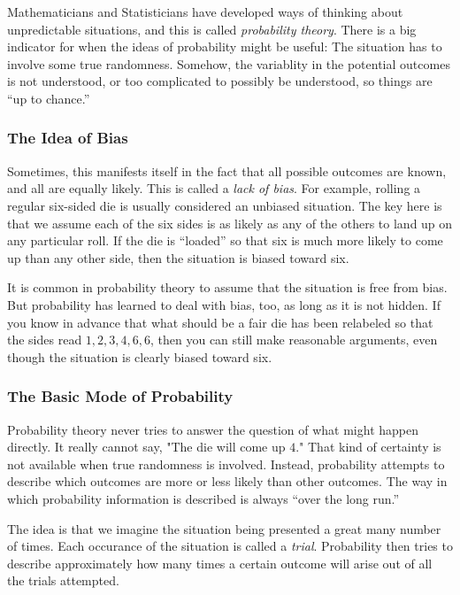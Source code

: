 \documentclass[12pt,letterpaper]{article}
\theoremstyle{definition}
\begin{document}
Mathematicians and Statisticians have developed ways of thinking about unpredictable situations, and this is called \emph{probability theory}.
There is a big indicator for when the ideas of probability might be useful:
The situation has to involve some true randomness.
Somehow, the variablity in the potential outcomes is not understood, or too complicated to possibly be understood, so things are ``up to chance.''

\subsubsection*{The Idea of Bias}

Sometimes, this manifests itself in the fact that all possible outcomes are known, and all are equally likely.
This is called a \emph{lack of bias}. 
For example, rolling a regular six-sided die is usually considered an unbiased situation.
The key here is that we assume each of the six sides is as likely as any of the others to land up on any particular roll.
If the die is ``loaded'' so that six is much more likely to come up than any other side, then the situation is biased toward six.

It is common in probability theory to assume that the situation is free from bias.
But probability has learned to deal with bias, too, as long as it is not hidden.
If you know in advance that what should be a fair die has been relabeled so that the sides read $1, 2, 3, 4, 6, 6$, then you can still make reasonable arguments, even though the situation is clearly biased toward six.

\subsubsection*{The Basic Mode of Probability}

Probability theory never tries to answer the question of what might happen directly.
It really cannot say, "The die will come up $4$."
That kind of certainty is not available when true randomness is involved.
Instead, probability attempts to describe which outcomes are more or less likely than other outcomes.
The way in which probability information is described is always ``over the long run.''

The idea is that we imagine the situation being presented a great many number of times. 
Each occurance of the situation is called a \emph{trial}.
Probability then tries to describe approximately how many times a certain outcome will arise out of all the trials attempted.
\end{document}
